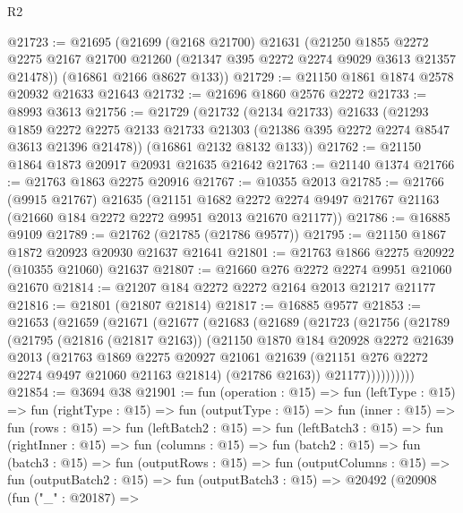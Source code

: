 \begin{lexlean}{R2}
\begin{coremodule}
@21723 := @21695
    (@21699
      (@2168 @21700)
      @21631
      (@21250
        @1855
        @2272
        @2275
        @2167
        @21700
        @21260
        (@21347 @395 @2272 @2274 @9029 @3613 @21357 @21478))
      (@16861 @2166 @8627 @133))
@21729 := @21150 @1861 @1874 @2578 @20932 @21633 @21643
@21732 := @21696 @1860 @2576 @2272
@21733 := @8993 @3613
@21756 := @21729
    (@21732
      (@2134 @21733)
      @21633
      (@21293
        @1859
        @2272
        @2275
        @2133
        @21733
        @21303
        (@21386 @395 @2272 @2274 @8547 @3613 @21396 @21478))
      (@16861 @2132 @8132 @133))
@21762 := @21150 @1864 @1873 @20917 @20931 @21635 @21642
@21763 := @21140 @1374
@21766 := @21763 @1863 @2275 @20916
@21767 := @10355 @2013
@21785 := @21766
    (@9915 @21767)
    @21635
    (@21151
      @1682
      @2272
      @2274
      @9497
      @21767
      @21163
      (@21660 @184 @2272 @2272 @9951 @2013 @21670 @21177))
@21786 := @16885 @9109
@21789 := @21762 (@21785 (@21786 @9577))
@21795 := @21150 @1867 @1872 @20923 @20930 @21637 @21641
@21801 := @21763 @1866 @2275 @20922 (@10355 @21060) @21637
@21807 := @21660 @276 @2272 @2274 @9951 @21060 @21670
@21814 := @21207 @184 @2272 @2272 @2164 @2013 @21217 @21177
@21816 := @21801 (@21807 @21814)
@21817 := @16885 @9577
@21853 := @21653
    (@21659
      (@21671
        (@21677
          (@21683
            (@21689
              (@21723
                (@21756
                  (@21789
                    (@21795
                      (@21816 (@21817 @2163))
                      (@21150
                        @1870
                        @184
                        @20928
                        @2272
                        @21639
                        @2013
                        (@21763
                          @1869
                          @2275
                          @20927
                          @21061
                          @21639
                          (@21151 @276 @2272 @2274 @9497 @21060 @21163 @21814)
                          (@21786 @2163))
                        @21177))))))))))
@21854 := @3694 @38
@21901 := fun (operation : @15) =>
  fun (leftType : @15) =>
  fun (rightType : @15) =>
  fun (outputType : @15) =>
  fun (inner : @15) =>
  fun (rows : @15) =>
  fun (leftBatch2 : @15) =>
  fun (leftBatch3 : @15) =>
  fun (rightInner : @15) =>
  fun (columns : @15) =>
  fun (batch2 : @15) =>
  fun (batch3 : @15) =>
  fun (outputRows : @15) =>
  fun (outputColumns : @15) =>
  fun (outputBatch2 : @15) =>
  fun (outputBatch3 : @15) =>
  @20492
    (@20908
      (fun ("_" : @20187) =>

\end{coremodule}
\end{lexlean}
